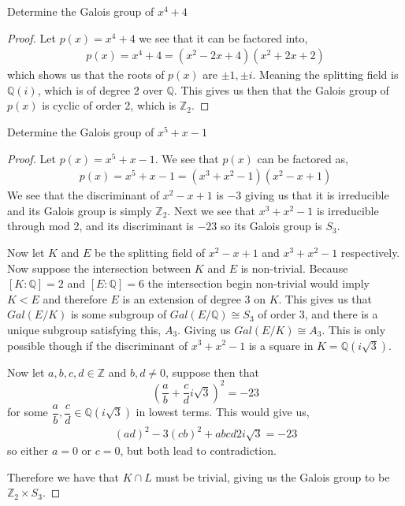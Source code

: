 \documentclass[11pt]{article}
\newenvironment{problem}[2][Problem\!]{\begin{tcolorbox}\begin{trivlist}
\item[\hskip \labelsep {\bfseries #1}\hskip \labelsep {\bfseries #2}]}{\end{trivlist}\end{tcolorbox}}
\newcommand{\zz}{\mathbb Z}   %
\newcommand{\qq}{\mathbb Q}   %
\newcommand{\lrp}[1]{\left(#1\right)}
\begin{document}
\begin{problem}{14.6.5}
    Determine the Galois group of $x^{4} + 4$
\end{problem}
\begin{proof}
    Let $p(x) = x^{4} + 4$ we see that it can be factored into,
    \begin{align*}
        p(x) = x^{4} + 4 = (x^{2} -2x + 4)(x^{2} + 2x + 2)
    \end{align*}
    which shows us that the roots of $p(x)$ are $\pm 1, \pm i$. Meaning the splitting field is $\qq(i)$, which is of degree 2 over $\qq$. This gives us then that the Galois group of $p(x)$ is cyclic of order 2, which is $\zz_2$.
\end{proof}
\vspace*{15pt}

\begin{problem}{14.6.10}
    Determine the Galois group of $x^{5} + x -1$
\end{problem}
\begin{proof}
    Let $p(x) = x^{5} + x -1$. We see that $p(x)$ can be factored as,
    \begin{align*}
        p(x) = x^{5} + x -1 = (x^{3} + x^{2} - 1)(x^{2} - x + 1) 
    \end{align*}
    We see that the discriminant of $x^{2} -x + 1$ is $-3$ giving us that it is irreducible and its Galois group is simply $\zz_2$. Next we see that $x^{3} +x^{2 }-1$ is irreducible through mod 2, and its discriminant is $-23$ so its Galois group is $S_3$. 

    Now let $K$ and $E$ be the splitting field of $x^{2} - x + 1$ and $x^{3}+x^{2} -1$ respectively. Now suppose the intersection between $K$ and $E$ is non-trivial. Because $[K: \qq ] = 2$ and $[E : \qq] = 6$ the intersection begin non-trivial would imply $K < E$ and therefore $E$ is an extension of degree $3$ on $K$. This gives us that $Gal(E/K)$ is some subgroup of $Gal(E/\qq) \cong S_3$ of order 3, and there is a unique subgroup satisfying this, $A_3$. Giving us $Gal(E/K) \cong A_3$. This is only possible though if the discriminant of $x^{3} + x^{2} -1$ is a square in $K = \qq(i \sqrt{3})$.  

    Now let $a,b,c,d \in \zz$ and $b,d \neq 0$, suppose then that 
    \[\lrp{\dfrac{a}{b} + \dfrac{c}{d}i\sqrt{3}}^{2} = -23\] for some $\dfrac{a}{b}, \dfrac{c}{d} \in \qq(i\sqrt{3})$ in lowest terms. This would give us,
    \begin{align*}
        (ad)^{2} -3(cb)^{2} + abcd2i\sqrt{3} = -23
    \end{align*}
    so either $a = 0$ or $c = 0$, but both lead to contradiction. 

    Therefore we have that $K\cap L$ must be trivial, giving us the Galois group to be $\zz_2 \times S_3$. 
\end{proof}
\end{document}
